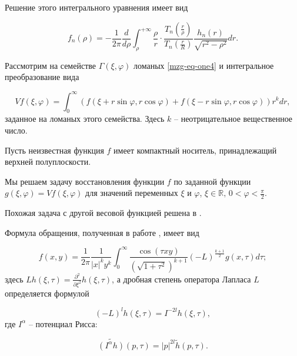 Решение этого интегрального уравнения имеет вид

$$f_n(\rho)=-\frac{1}{2\pi}\frac{d}{d\rho}\int_\rho^{+\infty}\frac{\rho}{r}\cdot\frac{T_n\left(\frac{r}{\rho}\right)}{T_n\left(\frac{r}{R}\right)}\frac{h_n(r)}{\sqrt{r^2-\rho^2}}dr.$$

Рассмотрим на семействе $\Gamma(\xi,\varphi)$ ломаных \eqref{mzg-eq-one4} и интегральное преобразование вида

\begin{equation}
\label{mzg-eq-one5}
Vf(\xi,\varphi)=\int_0^\infty\left( f(\xi+ r \sin \varphi, r \cos \varphi)+f(\xi-r \sin \varphi, r \cos \varphi)\right)r^k dr,
\end{equation}
заданное на ломаных этого семейства. Здесь $k$ -- неотрицательное вещественное число.

Пусть неизвестная функция $f$ имеет компактный носитель, принадлежащий верхней полуплоскости.

Мы решаем задачу восстановления функции $f$ по заданной функции $g(\xi,\varphi)=Vf(\xi,\varphi)$ для значений переменных $\xi$ и $\varphi$, $\xi\in\mathbb R,\, 0<\varphi<\frac{\pi}{2}$.

Похожая задача с другой весовой функцией решена в \cite{mzg-Kuchment}.

Формула обращения, полученная в работе \cite{mzg-Medzhidov2}, имеет вид

\begin{equation}
\label{mzg-eq-one8}
f(x,y)=\frac{1}{2\pi}\frac{1}{|x|^k y^k}\int_0^\infty \frac{\cos (\tau xy) }{\left(\sqrt{1+\tau^2}\right)^{k+1}}(-L)^{\frac{k+1}{2}}g(x,\tau)d\tau;
\end{equation}
здесь $Lh(\xi,\tau)=\frac{\partial^2}{\partial\xi^2 }h(\xi,\tau)$, а дробная степень оператора Лапласа $L$ определяется формулой

$$(-L)^lh(\xi,\tau)=I^{-2l}h(\xi,\tau),$$
где $I^\alpha$ -- потенциал Рисса:

$$\widetilde{\left(I^\alpha h\right)}(p,\tau)=|p|^{2l}\tilde h(p,\tau).$$







